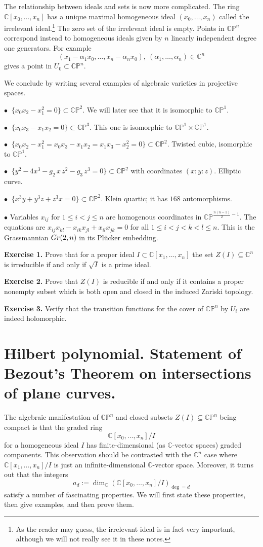\documentclass[11pt]{article}
\numberwithin{equation}{section}
\numberwithin{footnote}{section}
\newcommand{\blue}{\color{blue}}
\newcommand{\Gr}{{\rm Gr}}
\renewcommand{\P}{{\mathbb P}}
\newcommand{\C}{{\mathbb C}}
\begin{document}
\smallskip
The relationship between ideals and sets is now more complicated. The ring $\C[x_0,\ldots, x_n]$  has a unique maximal homogeneous ideal $(x_0,\ldots,x_n)$ called the {\blue irrelevant ideal}.\footnote{ As the reader may guess, the irrelevant ideal is in fact very important, although we will not really see it in these notes.} The zero set of the irrelevant ideal is empty. Points in $\C\P^n$ correspond instead to homogeneous ideals given by $n$ linearly independent degree one generators. For example
 $$
 (x_1-\alpha_1x_0, \ldots, x_n-\alpha_n x_0),~(\alpha_1,\ldots, \alpha_n)\in \C^n
 $$
gives a point in $U_0\subset \C\P^n$.



\smallskip
We conclude by writing several examples of algebraic varieties in projective spaces.

$\bullet$ $~\{x_0x_2-x_1^2 =0\}\subset \C\P^2.$ We will later see that it is isomorphic to $\C\P^1$.

$\bullet$ $~\{x_0x_3-x_1x_2=0\}\subset \C\P^3.$ This one is isomorphic to $\C\P^1\times \C\P^1$.

$\bullet$ $~\{x_0x_2-x_1^2 =x_0 x_3 -x_1 x_2 = x_1 x_3 - x_2^2 =0\}\subset \C\P^2.$  Twisted cubic, isomorphic to  $\C\P^1$.

$\bullet$ $~\{y^2-4x^3-g_2\, x\,z^2 - g_3\,z^3=0\}\subset \C\P^2$ with coordinates $(x:y:z).$ Elliptic curve.


$\bullet$ $~\{x^3y+y^3z+z^3x=0\}\subset \C\P^2.$  Klein quartic; it has $168$ automorphisms.

$\bullet$ Variables  $x_{ij}$ for $1\leq i<j\leq n$ are homogenous coordinates in $\C\P^{\frac {n(n-1)}2-1}$. The equations 
are $x_{ij}x_{kl}-x_{ik}x_{jl}+x_{il}x_{jk} = 0$ for all $1\leq i<j<k<l\leq n$. This is the Grassmannian $\Gr(2,n)$ in its Pl\"ucker embedding.


\smallskip
{\bf Exercise 1.} Prove that for a proper ideal $I\subset \C[x_1,\ldots, x_n]$ the set $Z(I)\subseteq \C^n$ is irreducible if and only if $\sqrt I$ is a prime ideal.

{\bf Exercise 2.} Prove that $Z(I)$ is reducible if and only if it contains a proper nonempty subset which is both open and closed in the induced Zariski topology.

{\bf Exercise 3.} Verify that the transition functions for the cover of $\C\P^n$ by $U_i$ are indeed holomorphic.


\section{Hilbert polynomial. Statement of Bezout's Theorem on intersections of plane curves.}\label{sec.B1}
The algebraic manifestation of $\C\P^n$ and closed subsets $Z(I)\subseteq \C\P^n$ being compact is that the graded ring
$$
\C[x_0,\ldots,x_n]/I
$$
for a homogeneous ideal $I$ has finite-dimensional (as $\C$-vector spaces) graded components. This  observation should be contrasted with the $\C^n$ case where $\C[x_1,\ldots,x_n]/I$ is just an infinite-dimensional $\C$-vector space. Moreover, it turns out that the integers
$$
a_d := \dim_{\C} (\C[x_0,\ldots,x_n]/I)_{\deg = d}
$$
satisfy a number of fascinating properties. We will first state these properties, then give examples, and then prove them.
\end{document}
